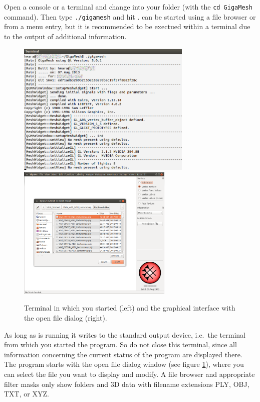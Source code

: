 Open a console or a terminal and change into your \GigaMesh folder (with the {\tt cd GigaMesh} command). 
Then type {\tt ./gigamesh} and hit \Return\!.
\GigaMesh can be started using a file browser or from a menu entry, 
but it is recommended to be exectued within a terminal due to the output of additional information.
\begin{figure}[H]
	\begin{center}
		\includegraphics[height=64mm]{figs/gigamesh_console_output} \includegraphics[height=64mm]{figs/gigamesh_gui_startup}
		\caption{Terminal in which you started \GigaMesh (left) and the graphical interface with the open file dialog (right).}\label{fig_start2}
	\end{center}
\end{figure}
As long as \GigaMesh is running it writes to the standard output device, i.e.~the terminal from which you started the program. 
So do not close this terminal, since all information concerning the current status of the program are displayed there. 
The program starts with the open file dialog window (see figure \ref{fig_start2}), where you can select the file you want to display and modify. 
A file browser and appropriate filter masks only show folders and 3D data with filename extensions PLY, OBJ, TXT, or XYZ.

